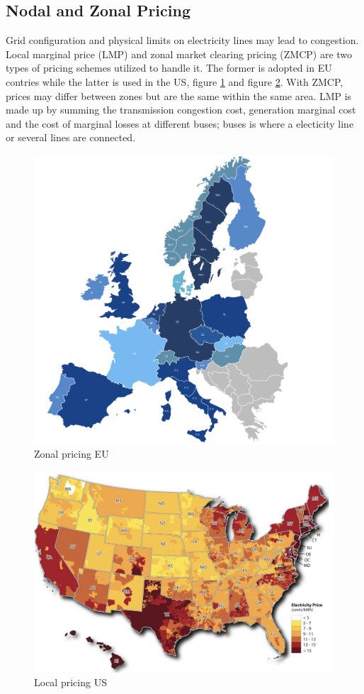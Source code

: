 \subsection{Nodal and Zonal Pricing}
Grid configuration and physical limits on electricity lines may lead to congestion. Local marginal price (LMP) and zonal market clearing pricing (ZMCP) are two types of pricing schemes utilized to handle it. The former is adopted in EU contries while the latter is used in the US, figure \ref{fig:eu_zonal} and figure \ref{fig:us_local}.
With ZMCP, prices may differ between zones but are the same within the same area.
LMP is made up by summing the transmission congestion cost, generation marginal cost and the cost of marginal losses at different buses; buses is where a electicity line or several lines are connected.
\begin{figure}[!h]
    \includegraphics[width=\textwidth]{images/eu_zonal.png}
    \caption{Zonal pricing EU \cite{eu_zonal}}
    \label{fig:eu_zonal}
\end{figure}

\begin{figure}[!h]
    \includegraphics[width=\textwidth]{images/us_local.png}
    \caption{Local pricing US \cite{us_local}}
    \label{fig:us_local}
\end{figure}

